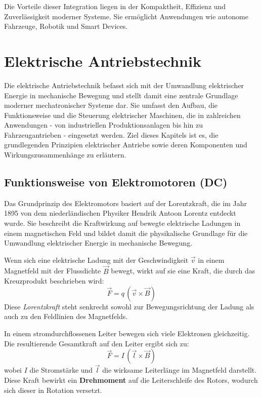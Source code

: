 Die Vorteile dieser Integration liegen in der Kompaktheit, Effizienz und Zuverlässigkeit moderner Systeme. Sie ermöglicht Anwendungen wie autonome Fahrzeuge, Robotik und Smart Devices. \autocite{Samanta2023}

\section{Elektrische Antriebstechnik}
\label{cha:Elektrische Antriebstechnik}

Die elektrische Antriebstechnik befasst sich mit der Umwandlung elektrischer Energie in mechanische Bewegung und stellt damit eine zentrale Grundlage moderner mechatronischer Systeme dar. \autocite{Trzesniowski2017} Sie umfasst den Aufbau, die Funktionsweise und die Steuerung elektrischer Maschinen, die in zahlreichen Anwendungen - von industriellen Produktionsanlagen bis hin zu Fahrzeugantrieben - eingesetzt werden. Ziel dieses Kapitels ist es, die grundlegenden Prinzipien elektrischer Antriebe sowie deren Komponenten und Wirkungszusammenhänge zu erläutern.

\subsection{Funktionsweise von Elektromotoren (DC)}
\label{cha:Funktionsweise von Elektromotoren (DC)}

Das Grundprinzip des Elektromotors basiert auf der Lorentzkraft, 
die im Jahr 1895 von dem niederländischen Physiker Hendrik Antoon Lorentz
entdeckt wurde\cite{Kressierer.2011}. Sie beschreibt die Kraftwirkung auf bewegte elektrische Ladungen 
in einem magnetischen Feld und bildet damit die physikalische Grundlage für die 
Umwandlung elektrischer Energie in mechanische Bewegung.

Wenn sich eine elektrische Ladung mit der Geschwindigkeit \( \vec{v} \) in einem 
Magnetfeld mit der Flussdichte \( \vec{B} \) bewegt, wirkt auf sie eine Kraft, 
die durch das Kreuzprodukt beschrieben wird\cite{Brandt.2021}:
\[
\vec{F} = q \, (\vec{v} \times \vec{B})
\]
Diese \emph{Lorentzkraft} steht senkrecht sowohl zur Bewegungsrichtung der Ladung 
als auch zu den Feldlinien des Magnetfelds. 

In einem stromdurchflossenen Leiter bewegen 
sich viele Elektronen gleichzeitig. Die resultierende Gesamtkraft auf den Leiter 
ergibt sich zu:
\[
\vec{F} = I \, (\vec{l} \times \vec{B})
\]
wobei \( I \) die Stromstärke und \( \vec{l} \) die wirksame Leiterlänge im Magnetfeld 
darstellt. Diese Kraft bewirkt ein \textbf{Drehmoment} auf die Leiterschleife des 
Rotors, wodurch sich dieser in Rotation versetzt.

